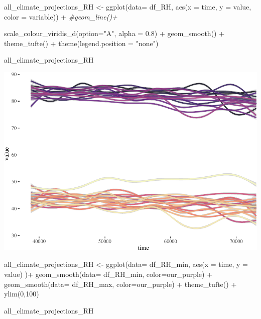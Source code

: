 \documentclass[
  paper=a4,
  ,captions=tableheading
]{scrartcl}
\newenvironment{Shaded}{\begin{snugshade}}{\end{snugshade}}
\newcommand{\AttributeTok}[1]{\textcolor[rgb]{0.77,0.63,0.00}{#1}}
\newcommand{\CommentTok}[1]{\textcolor[rgb]{0.56,0.35,0.01}{\textit{#1}}}
\newcommand{\DecValTok}[1]{\textcolor[rgb]{0.00,0.00,0.81}{#1}}
\newcommand{\FloatTok}[1]{\textcolor[rgb]{0.00,0.00,0.81}{#1}}
\newcommand{\FunctionTok}[1]{\textcolor[rgb]{0.00,0.00,0.00}{#1}}
\newcommand{\NormalTok}[1]{#1}
\newcommand{\OtherTok}[1]{\textcolor[rgb]{0.56,0.35,0.01}{#1}}
\newcommand{\SpecialCharTok}[1]{\textcolor[rgb]{0.00,0.00,0.00}{#1}}
\newcommand{\StringTok}[1]{\textcolor[rgb]{0.31,0.60,0.02}{#1}}
\begin{document}
\begin{Shaded}
\begin{Highlighting}[]
\NormalTok{all\_climate\_projections\_RH }\OtherTok{\textless{}{-}} \FunctionTok{ggplot}\NormalTok{(}\AttributeTok{data=}\NormalTok{ df\_RH, }\FunctionTok{aes}\NormalTok{(}\AttributeTok{x =}\NormalTok{ time, }\AttributeTok{y =}\NormalTok{ value, }\AttributeTok{color =}\NormalTok{ variable)) }\SpecialCharTok{+} 
  \CommentTok{\#geom\_line()+}
  
  \FunctionTok{scale\_colour\_viridis\_d}\NormalTok{(}\AttributeTok{option=}\StringTok{"A"}\NormalTok{, }\AttributeTok{alpha =} \FloatTok{0.8}\NormalTok{) }\SpecialCharTok{+}
  \FunctionTok{geom\_smooth}\NormalTok{() }\SpecialCharTok{+}
  \FunctionTok{theme\_tufte}\NormalTok{() }\SpecialCharTok{+}
  \FunctionTok{theme}\NormalTok{(}\AttributeTok{legend.position =} \StringTok{"none"}\NormalTok{) }
  

\NormalTok{all\_climate\_projections\_RH}
\end{Highlighting}
\end{Shaded}

\includegraphics{Haskell_files/figure-latex/unnamed-chunk-49-1.pdf}

\begin{Shaded}
\begin{Highlighting}[]
\NormalTok{all\_climate\_projections\_RH }\OtherTok{\textless{}{-}} \FunctionTok{ggplot}\NormalTok{(}\AttributeTok{data=}\NormalTok{ df\_RH\_min, }\FunctionTok{aes}\NormalTok{(}\AttributeTok{x =}\NormalTok{ time, }\AttributeTok{y =}\NormalTok{ value) )}\SpecialCharTok{+} 
  \FunctionTok{geom\_smooth}\NormalTok{(}\AttributeTok{data=}\NormalTok{ df\_RH\_min, }\AttributeTok{color=}\NormalTok{our\_purple) }\SpecialCharTok{+}
  \FunctionTok{geom\_smooth}\NormalTok{(}\AttributeTok{data=}\NormalTok{ df\_RH\_max, }\AttributeTok{color=}\NormalTok{our\_purple) }\SpecialCharTok{+}
  \FunctionTok{theme\_tufte}\NormalTok{() }\SpecialCharTok{+}
  \FunctionTok{ylim}\NormalTok{(}\DecValTok{0}\NormalTok{,}\DecValTok{100}\NormalTok{)}
  

\NormalTok{all\_climate\_projections\_RH}
\end{Highlighting}
\end{Shaded}
\end{document}
